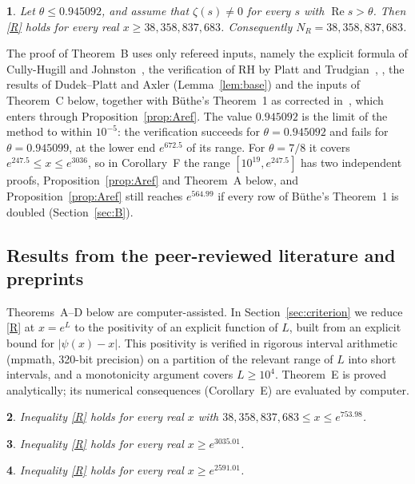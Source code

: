 \documentclass{amsart}
\theoremstyle{definition}
\theoremstyle{remark}
\theoremstyle{plain}
\newcommand{\lettername}{}
\newtheorem*{letteredthm*}{\lettername}
\newenvironment{lthm}[1]{\renewcommand{\lettername}{Theorem #1}\begin{letteredthm*}}{\end{letteredthm*}}
\numberwithin{equation}{section}
\newcommand{\NN}{38{,}358{,}837{,}683}
\newcommand{\Cstar}{C$^*$}
\newcommand{\thetaB}{0.945092}
\begin{document}
\begin{lthm}{B}
Let $\theta\le\thetaB$, and assume that $\zeta(s)\ne0$ for every $s$ with $\operatorname{Re}s>\theta$. Then \eqref{R} holds for every real $x\ge\NN$. Consequently $N_R=\NN$.
\end{lthm}

The proof of Theorem~B uses only refereed inputs, namely the explicit formula of Cully-Hugill and Johnston~\cite{CHJ23}, the verification of RH by Platt and Trudgian~\cite{PT21a}, \cite[Lemma~3]{But16}, the results of Dudek--Platt and Axler (Lemma~\ref{lem:base}) and the inputs of Theorem~C below, together with B\"uthe's Theorem~1 as corrected in~\cite{Bha24}, which enters through Proposition~\ref{prop:Aref}. The value $\thetaB$ is the limit of the method to within $10^{-5}$: the verification succeeds for $\theta=\thetaB$ and fails for $\theta=0.945099$, at the lower end $e^{672.5}$ of its range. For $\theta=7/8$ it covers $e^{247.5}\le x\le e^{3036}$, so in Corollary~F the range $[10^{19},e^{247.5}]$ has two independent proofs, Proposition~\ref{prop:Aref} and Theorem~A below, and Proposition~\ref{prop:Aref} still reaches $e^{564.99}$ if every row of B\"uthe's Theorem~1 is doubled (Section~\ref{sec:B}).

\subsection{Results from the peer-reviewed literature and preprints}

Theorems~A--D below are computer-assisted. In Section~\ref{sec:criterion} we reduce \eqref{R} at $x=e^L$ to the positivity of an explicit function of $L$, built from an explicit bound for $|\psi(x)-x|$. This positivity is verified in rigorous interval arithmetic (mpmath, 320-bit precision) on a partition of the relevant range of $L$ into short intervals, and a monotonicity argument covers $L\ge10^4$. Theorem~E is proved analytically; its numerical consequences (Corollary~E) are evaluated by computer.

\begin{lthm}{A}
Inequality \eqref{R} holds for every real $x$ with $\NN\le x\le e^{753.98}$.
\end{lthm}

\begin{lthm}{C}
Inequality \eqref{R} holds for every real $x\ge e^{3035.01}$.
\end{lthm}

\begin{lthm}{\Cstar}
Inequality \eqref{R} holds for every real $x\ge e^{2591.01}$.
\end{lthm}
\end{document}
